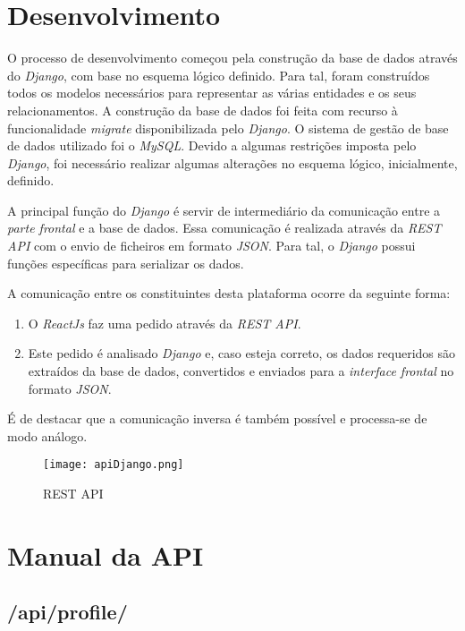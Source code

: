 \documentclass[11pt,a4paper]{report}
\begin{document}
\section{Desenvolvimento}
O processo de desenvolvimento começou pela construção da base de dados através do \emph{Django}, com base no esquema lógico definido. Para tal, foram construídos todos os modelos necessários para representar as várias entidades e os seus relacionamentos. A construção da base de dados foi feita com recurso à funcionalidade \emph{migrate} disponibilizada pelo \emph{Django}. O sistema de gestão de base de dados utilizado foi o \emph{MySQL}.
Devido a algumas restrições imposta pelo \emph{Django}, foi necessário realizar algumas alterações no esquema lógico, inicialmente, definido.

A principal função do \emph{Django} é servir de intermediário da comunicação entre a \emph{parte frontal} e a base de dados. Essa comunicação é realizada através da \emph{REST API} com o envio de ficheiros em formato \emph{JSON}. Para tal, o \emph{Django} possui funções específicas para serializar os dados. 

A comunicação entre os constituintes desta plataforma ocorre da seguinte forma: 
\begin{enumerate}
    \item O \emph{ReactJs} faz uma pedido através da \emph{REST API}.
    \item Este pedido é analisado \emph{Django} e, caso esteja correto, os dados requeridos são extraídos da base de dados, convertidos e enviados para a \emph{interface frontal} no formato \emph{JSON}.
\end{enumerate}

É de destacar que a comunicação inversa é também possível e processa-se de modo análogo.
\newline\newline

\begin{figure}[h]
\centering
\texttt{[image: apiDjango.png]}
\caption{REST API}
\label{fig:pagDJang}
\end{figure}

\newpage

\section{Manual da API}

\subsection{/api/profile/}
\end{document}
